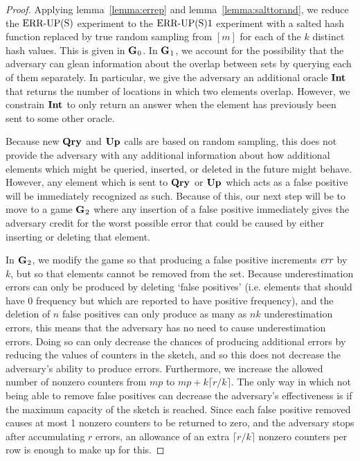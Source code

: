 \begin{proof}

Applying lemma~\ref{lemma:errep} and lemma~\ref{lemma:salttorand}, we reduce the $\textnormal{ERR\mbox{-}UP(S)}$ experiment to the $\textnormal{ERR\mbox{-}UP(S)}1$ experiment with a salted hash function replaced by true random sampling from $[m]$ for each of the $k$ distinct hash values. This is given in $\mathbf{G}\hspace{0.5pt}_0$. In $\mathbf{G}\hspace{0.5pt}_1$, we account for the possibility that the adversary can glean information about the overlap between sets by querying each of them separately. In particular, we give the adversary an additional oracle $\mathbf{Int}\hspace{0.5pt}$ that returns the number of locations in which two elements overlap. However, we constrain $\mathbf{Int}\hspace{0.5pt}$ to only return an answer when the element has previously been sent to some other oracle.

Because new $\mathbf{Qry}\hspace{0.5pt}$ and $\mathbf{Up}\hspace{0.5pt}$ calls are based on random sampling, this does not provide the adversary with any additional information about how additional elements which might be queried, inserted, or deleted in the future might behave. However, any element which is sent to $\mathbf{Qry}\hspace{0.5pt}$ or $\mathbf{Up}\hspace{0.5pt}$ which acts as a false positive will be immediately recognized as such. Because of this, our next step will be to move to a game $\mathbf{G}\hspace{0.5pt}_2$ where any insertion of a false positive immediately gives the adversary credit for the worst possible error that could be caused by either inserting or deleting that element.


In $\mathbf{G}\hspace{0.5pt}_2$, we modify the game so that producing a false positive increments $\textit{err}$ by $k$, but so that elements cannot be removed from the set. Because underestimation errors can only be produced by deleting `false positives' (i.e. elements that should have 0 frequency but which are reported to have positive frequency), and the deletion of $n$ false positives can only produce as many as $nk$ underestimation errors, this means that the adversary has no need to cause underestimation errors. Doing so can only decrease the chances of producing additional errors by reducing the values of counters in the sketch, and so this does not decrease the adversary's ability to produce errors. Furthermore, we increase the allowed number of nonzero counters from $mp$ to $mp + k\lceil r/k \rceil$. The only way in which not being able to remove false positives can decrease the adversary's effectiveness is if the maximum capacity of the sketch is reached. Since each false positive removed causes at most 1 nonzero counters to be returned to zero, and the adversary stops after accumulating $r$ errors, an allowance of an extra $\lceil r/k \rceil$ nonzero counters per row is enough to make up for this.


\end{proof}
